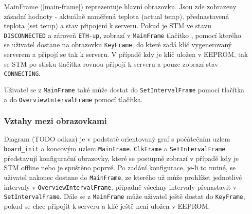 MainFrame (\ref{main-frame}) reprezentuje hlavní obrazovku.
Jsou zde zobrazeny zásadní hodnoty - aktuálně naměřená teplota (actual temp), přednastavená teplota
(set temp) a stav připojení k serveru.
Pokud je STM ve stavu \texttt{DISCONNECTED} a zároveň \texttt{ETH-up}, zobrazí v \texttt{MainFrame}
tlačítko , pomocí kterého se uživatel dostane na obrazovku \texttt{KeyFrame}, do které zadá klíč
vygenerovaný serverem a připojí se tak k serveru.
V případě kdy je klíč uložen v EEPROM, tak se STM po stisku tlačítka  rovnou připojí k serveru
a pouze zobrazí stav \texttt{CONNECTING}.

Uživatel se z \texttt{MainFrame} také může dostat do \texttt{SetIntervalFrame} pomocí 
tlačítka a do \texttt{OverviewIntervalFrame} pomocí  tlačítka.

\subsubsection{Vztahy mezi obrazovkami}


Diagram (TODO odkaz) je v podstatě orientovaný graf s počátečním uzlem \texttt{board\_init}
a koncovým uzlem \texttt{MainFrame}.
\texttt{ClkFrame} a \texttt{SetIntervalFrame} představují konfigurační obrazovky, které se postupně
zobrazí v případě kdy je STM offline nebo je spuštěno poprvé.
Po zadání konfigurace, je-li to nutné, se uživatel nakonec dostane do \texttt{MainFrame}, ze kterého
už může prohlížet jednotlivé intervaly v \texttt{OverviewIntervalFrame}, případně všechny intervaly
přenastavit v \texttt{SetIntervalFrame}.
Dále se z \texttt{MainFrame} může uživatel ještě dostat do \texttt{KeyFrame}, pokud se chce připojit
k serveru a klíč ještě není uložen v EEPROM.

